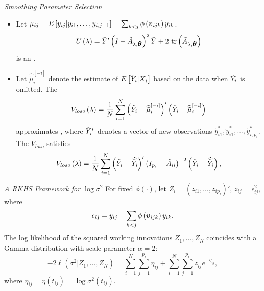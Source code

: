 \begin{frame}{\textit{Smoothing Parameter Selection}}{}\footnotesize
\begin{itemize}
\item Let $\mu_{ij} = E\left[y_{ij}\vert y_{i1}, \dots, y_{i,j-1}\right] = \sum_{k<j} \phi\left(\mbox{\boldmath $v$}_{ijk} \right) y_{ik}$.
	\footnotesize
	\begin{equation*} 
	U\left(\lambda\right) = \tilde{Y}'\left( I - \tilde{A}_{\lambda,\mbox{\boldmath $\theta$}} \right)^2\tilde{Y} + {2}\mbox{ tr}\left(\tilde{A}_{\lambda,\mbox{\boldmath $\theta$}}\right)
	\end{equation*}\footnotesize is an .
	\item \footnotesize Let $\widehat{\tilde{\mu}}^{\left[-i\right]}_{i}$ denote the estimate of $E\left[ \tilde{Y}_i \vert X_i \right]$ based on the data when $\tilde{Y}_i$ is omitted. The 
	\begin{equation*} %
	V_{loso}\left(\lambda\right) = \frac{1}{N}\sum_{i=1}^N \left( \tildeY_i - \widehat{\tilde{\mu}}^{\left[-i\right]}_{i}\right)'\left( \tildeY_i -  \widehat{\tilde{\mu}}^{\left[-i\right]}_{i}\right)
	\end{equation*}
	approximates , where $\tilde{Y}^*_i$ denotes a vector of new 	observations $\tilde{y}_{i1}^*, \tilde{y}_{i1}^*, \dots, \tilde{y}_{i, p_i}^*$. The $V_{loso}$ satisfies
  \begin{equation*}
 V_{loso}\left( \lambda \right) = \frac{1}{N} \sum_{i = 1}^N \left(\tilde{Y}_i - \widehat{\tilde{Y}_i}\right)' \left(I_{p_i} - \tilde{A}_{ii}\right)^{-2}\left(\tilde{Y}_i - \widehat{\tilde{Y}_i}\right),
  \end{equation*}
	\end{itemize}
	\end{frame}



\begin{frame}{\textit{A RKHS Framework for $\log \sigma^2$}}
For fixed $\phi\left(\cdot\right)$, let $Z_i = \left(z_{i1}, \dots , z_{ip_i}\right)'$, $z_{ij} = \epsilon_{ij}^2$, where
\[
\epsilon_{ij} =  y_{ij} - \sum_{k<j} \phi\left(\mbox{\boldmath $v$}_{ijk}\right) y_{ik}.
\]
The log likelihood of the squared working innovations $Z_1,\dots, Z_N$ coincides with a Gamma distribution with scale parameter $\alpha = 2$:
\begin{equation*} %
-2\ell\left(  \sigma^2 \vert Z_1,\dots, Z_N \right) =  \sum_{i = 1}^N \sum_{j = 1}^{p_i} \eta_{ij}  + \sum_{i = 1}^N \sum_{j = 1}^{p_i} z_{ij}e^{-\eta_{ij}},
\end{equation*}
\noindent
where $\eta_{ij} = \eta\left(t_{ij}\right) = \log \sigma^2\left(t_{ij}\right)$.
\end{frame}



